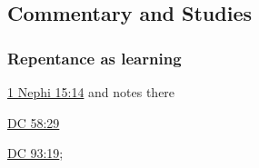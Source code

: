 
	
	
	
	
\subsection{Commentary and Studies} %
	\label{REPENTANCE-COMMENTARY}

	
		
	\subsubsection{Repentance as learning}
		\label{REPENTANCE-learning}
		
		\begin{compactitem}
			\item \hyperref[1NEPHI-15-14]{1 Nephi 15:14} and notes there
			\item \hyperref[DC58-29]{DC 58:29}
			\item \hyperref[DC93-19]{DC 93:19}; 
		\end{compactitem}